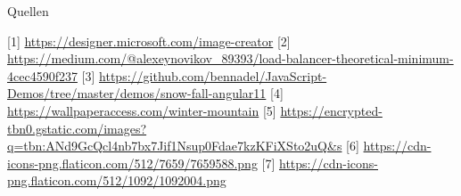 \documentclass{beamer}
\begin{document}
\begin{frame}{Quellen}
	\begin{thebibliography}{1}
[1]{ \url{https://designer.microsoft.com/image-creator}}
[2]{ \url{https://medium.com/@alexeynovikov_89393/load-balancer-theoretical-minimum-4cec4590f237}}
[3]{ \url{https://github.com/bennadel/JavaScript-Demos/tree/master/demos/snow-fall-angular11}}
[4]{ \url{https://wallpaperaccess.com/winter-mountain}}
[5]{ \url{https://encrypted-tbn0.gstatic.com/images?q=tbn:ANd9GcQcl4nb7bx7Jif1Nsup0Fdae7kzKFiXSto2uQ&s}}
[6]{ \url{https://cdn-icons-png.flaticon.com/512/7659/7659588.png}}
[7]{ \url{https://cdn-icons-png.flaticon.com/512/1092/1092004.png}}

\end{thebibliography}
\end{frame}


	
    	
    	
    	
\end{document}
